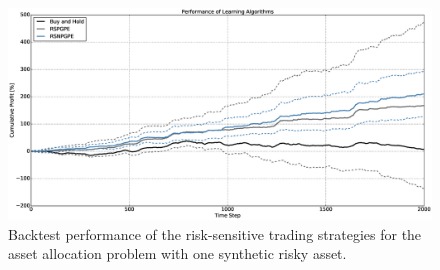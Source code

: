\begin{figure}[t!]
	\centering
	\includegraphics[width=1.0\textwidth]{Images/8_5_single_synthetic_sensitive_performance}
	\caption[Backtest performance with one synthetic risky asset.]{Backtest performance of the risk-sensitive trading strategies for the asset allocation problem with one synthetic risky asset.}
	\label{fig:single_synthetic_sensitive_performance}
\end{figure}

